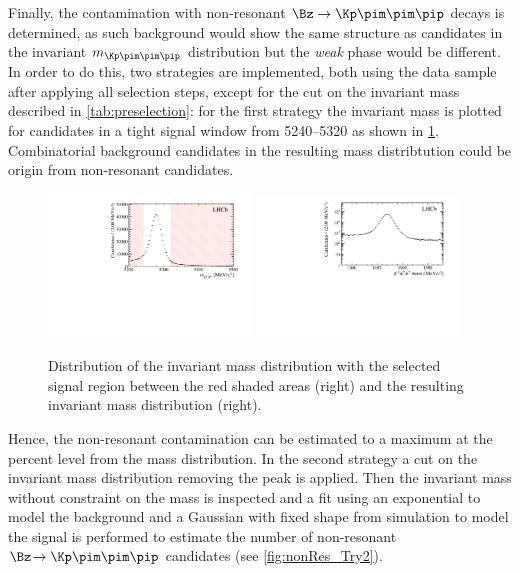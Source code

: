Finally, the contamination with non-resonant $\Bz\to\Kp\pim\pim\pip$ decays is determined, as such background would show the same structure as \BdToDpi candidates in the invariant $m_{\Kp\pim\pim\pip}$ distribution but the \emph{weak} phase would be different.
In order to do this, two strategies are implemented, both using the data sample after applying all selection steps, except for the cut on the invariant \Dm mass described in \cref{tab:preselection}:
for the first strategy the invariant \Dm mass is plotted for candidates in a tight \Bz signal window from \SIrange[per-mode=symbol]{5240}{5320}{\MeVcc} as shown in \cref{fig:nonRes_Try1}.
Combinatorial background candidates in the resulting \Dm mass distribtution could be origin from non-resonant \Kpm\pimp\pimp\pipm candidates.
\begin{figure}[tb]
    \centering
    \includegraphics[width=0.48\textwidth]{06selection/figs/BmassCut.pdf}
    \includegraphics[width=0.48\textwidth]{06selection/figs/Resulting_Dmass.pdf}
    \caption{Distribution of the invariant \Bz mass distribution with the selected signal region between the red shaded areas (right) and the resulting invariant \Dm mass distribution (right).}
    \label{fig:nonRes_Try1}
\end{figure}
Hence, the non-resonant contamination can be estimated to a maximum at the percent level from the \Dm mass distribution.
In the second strategy a cut on the invariant \Dm mass distribution removing the \Dm peak is applied.
Then the invariant \Bz mass without constraint on the \Dm mass is inspected and a fit using an exponential to model the background and a Gaussian with fixed shape from simulation to model the signal is performed to estimate the number of non-resonant $\Bz\!\to\Kp\pim\pim\pip$ candidates (see \cref{fig:nonRes_Try2}).
